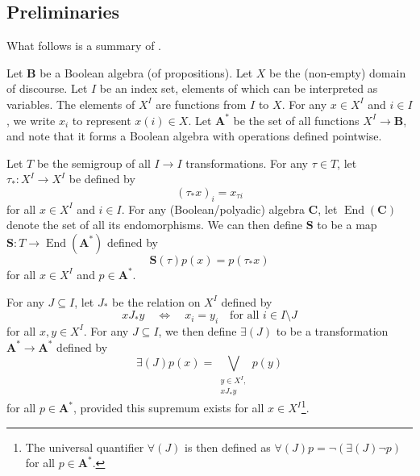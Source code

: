 \documentclass{article}
\theoremstyle{definition}
\theoremstyle{remark}
\DeclareMathOperator{\End}{End}
\begin{document}

\subsection{Preliminaries}

What follows is a summary of \cite{halmos2016algebraic}.

Let $\mathbf{B}$ be a Boolean algebra (of propositions). Let $X$ be the
(non-empty) domain of discourse. Let $I$ be an index set, elements of which can
be interpreted as variables. The elements of $X^I$ are functions from $I$ to
$X$. For any $x \in X^I$ and $i \in I$, we write $x_i$ to represent $x(i) \in
X$. Let $\mathbf{A^*}$ be the set of all functions $X^I \to \mathbf{B}$, and
note that it forms a Boolean algebra with operations defined pointwise.

Let $T$ be the semigroup of all $I \to I$ transformations. For any $\tau \in
T$, let $\tau_* : X^I \to X^I$ be defined by
\[
  (\tau_* x)_i = x_{\tau i}
\]
for all $x \in X^I$ and $i \in I$. For any (Boolean/polyadic) algebra
$\mathbf{C}$, let $\End(\mathbf{C})$ denote the set of all its endomorphisms. We
can then define $\mathbf{S}$ to be a map $\mathbf{S} : T \to \End(\mathbf{A^*})$
defined by
\[
  \mathbf{S}(\tau)p(x) = p(\tau_* x)
\]
for all $x \in X^I$ and $p \in \mathbf{A^*}$.

For any $J \subseteq I$, let $J_*$ be the relation on $X^I$ defined by
\[
  xJ_*y \quad \iff \quad x_i = y_i \quad \text{for all } i \in I \setminus J
\]
for all $x, y \in X^I$. For any $J \subseteq I$, we then define $\bm\exists(J)$
to be a transformation $\mathbf{A^*} \to \mathbf{A^*}$ defined by
\[
  \bm\exists(J)p(x) = \bigvee_{\substack{y \in X^I,\\ xJ_*y}} p(y)
\]
for all $p \in \mathbf{A^*}$, provided this supremum exists for all $x \in
X^I$\footnote{The universal quantifier $\bm\forall(J)$ is then defined as
  $\bm\forall(J)p = \neg(\bm\exists(J)\neg p)$ for all $p \in \mathbf{A^*}$.}.
\end{document}

